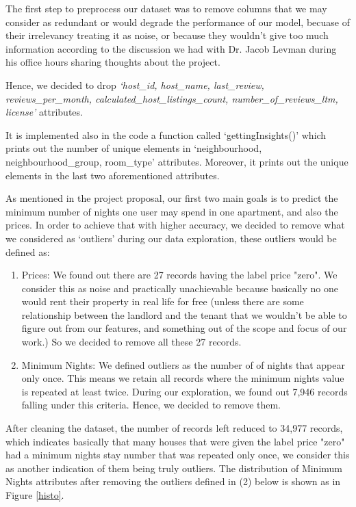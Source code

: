 \documentclass[a4paper,12pt]{article}
\begin{document}
The first step to preprocess our dataset was to remove columns that we may consider as redundant or would degrade the performance of our model, becuase of their irrelevancy treating it as noise, or because they wouldn't give too much information according to the discussion we had with Dr. Jacob Levman during his office hours sharing thoughts about the project.

Hence, we decided to drop \textit{`host\_id, host\_name, last\_review, reviews\_per\_month, calculated\_host\_listings\_count, number\_of\_reviews\_ltm, license'} attributes.

It is implemented also in the code a function called `gettingInsights()' which prints out the number of unique elements in `neighbourhood, neighbourhood\_group, room\_type' attributes. Moreover, it prints out the unique elements in the last two aforementioned attributes.

As mentioned in the project proposal, our first two main goals is to predict the minimum number of nights one user may spend in one apartment, and also the prices. In order to achieve that with higher accuracy, we decided to remove what we considered as `outliers' during our data exploration, these outliers would be defined as:

\begin{enumerate}
    \item Prices: We found out there are 27 records having the label price "zero". We consider this as noise and practically unachievable because basically no one would rent their property in real life for free (unless there are some relationship between the landlord and the tenant that we wouldn't be able to figure out from our features, and something out of the scope and focus of our work.) So we decided to remove all these 27 records.

    \item Minimum Nights: We defined outliers as the number of of nights that appear only once. This means we retain all records where the minimum nights value is repeated at least twice. During our exploration, we found out 7,946 records falling under this criteria. Hence, we decided to remove them.
\end{enumerate}

After cleaning the dataset, the number of records left reduced to 34,977 records, which indicates basically that many houses that were given the label price "zero" had a minimum nights stay number that was repeated only once, we consider this as another indication of them being truly outliers. The distribution of Minimum Nights attributes after removing the outliers defined in (2) below is shown as in Figure \ref{histo}. \newline
\end{document}
